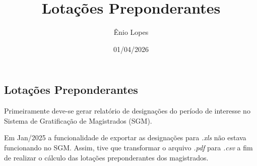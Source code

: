 \documentclass[
  letterpaper,
  DIV=11,
  numbers=noendperiod]{scrartcl}
\title{Lotações Preponderantes}
\author{Ênio Lopes}
\date{01/04/2026}
\begin{document}
\maketitle

\subsection{Lotações
Preponderantes}\label{lotauxe7uxf5es-preponderantes}

Primeiramente deve-se gerar relatório de designações do período de
interesse no Sistema de Gratificação de Magistrados (SGM).

Em Jan/2025 a funcionalidade de exportar as designações para \emph{.xls}
não estava funcionando no SGM. Assim, tive que transformar o arquivo
\emph{.pdf} para \emph{.csv} a fim de realizar o cálculo das lotações
preponderantes dos magistrados.
\end{document}
